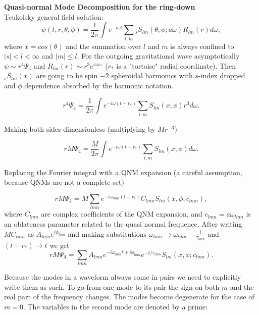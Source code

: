 \documentclass[11pt]{article}
\begin{document}
\noindent
{\large\bf Quasi-normal Mode Decomposition for the ring-down} \\

Teukolsky general field solution:
\begin{equation}
\psi(t,r,\theta,\phi) = \frac{1}{2\pi} \int {e^{-i\omega t} \sum_{l,m} {}_sS_{lm}(\theta, \phi ; a\omega )R_{lm}(r) d\omega },
\end{equation}
where $x=cos(\theta)$ and the summation over $l$ and $m$ is always confined to $|s|< l < \infty$ and $|m| \leq l$. For the outgoing gravitational wave asymptotically $\psi \sim r^4\Psi_4$ and $R_{lm}(r) \sim r^3e^{i\omega r_*}$ ($r_*$ is a "tortoise" radial coordinate). Then ${}_sS_{lm}(x)$ are going to be spin $-2$ spheroidal harmonics with $s$-index dropped and $\phi$ dependence absorbed by the harmonic notation.

\begin{equation}
r^4\Psi_4 = \frac{1}{2\pi} \int {e^{-i\omega (t-r_*)} \sum_{l,m} S_{lm}(x,\phi) r^3 d\omega }.
\end{equation}

\noindent
Making both sides dimensionless (multiplying by $Mr^{-3}$)

\begin{equation}
rM\Psi_4 = \frac{M}{2\pi} \int {e^{-i\omega (t-r_*)} \sum_{l,m} S_{lm}(x,\phi) d\omega }.
\end{equation}

\noindent
Replacing the Fourier integral with a QNM expansion (a careful assumption, because QNMs are not a complete set)

\begin{equation}
rM\Psi_4 = M \sum_{lmn}e^{-i\omega_{lmn} (t-r_*)} C_{lmn} S_{lm}(x,\phi ; c_{lmn}), 
\end{equation}
where $C_{lmn}$ are complex coefficients of the QNM expansion, and $c_{lmn}=a\omega_{lmn}$ is an oblateness parameter related to the quasi normal frequence. After writing $MC_{lmn}$ as $A_{lmn}e^{i\phi_{lmn}}$ and making substitutions $\omega_{lmn} \rightarrow  \omega_{lmn} - \frac{i}{\tau_{lmn}}$ and $(t-r_*) \rightarrow t$ we get
\begin{equation}
rM\Psi_4 = \sum_{lmn} A_{lmn} e^{-i\omega_{lmn}t+i\phi_{lmn}}e^{-t/\tau_{lmn}} S_{lm}(x,\phi ; c_{lmn}).
\end{equation}

\noindent
Because the modes in a waveform always come in pairs we need to explicitly write them as such. To go from one mode to its pair the sign on both $m$ and the real part of the frequency changes. The modes become degenerate for the case of $m=0$. The variables in the second mode are denoted by a prime:
\end{document}
